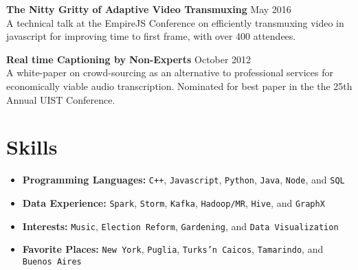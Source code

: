 \documentclass[oneside, final]{scrartcl}
\newcommand{\lang}[1]{\colorbox{light-gray}{\texttt{#1}}}
\begin{document}
\begin{center}
\begin{flushleft}
    \textbf{The Nitty Gritty of Adaptive Video Transmuxing} \hfill May  2016\\
    A technical talk at the EmpireJS Conference on efficiently transmuxing video in javascript for improving time to first frame, with over 400 attendees.
    \vspace{10pt}
    
    \textbf{Real time Captioning by Non-Experts} \hfill October  2012\\
    A white-paper on crowd-sourcing as an alternative to professional services for economically viable audio transcription. Nominated for best paper in the the 25th Annual UIST Conference.
    
\end{flushleft}


    \section{Skills}
    \begin{itemize}
        \setlength{\itemsep}{1pt}
        \setlength{\parskip}{0pt}
        \setlength{\parsep}{0pt}
        \setlength{\leftmargin}{-5mm}
       

        \item \textbf{Programming Languages:}
            \lang{C++},
            \lang{Javascript},
            \lang{Python},
            \lang{Java},
            \lang{Node}, and
            \lang{SQL} \\
            
        \item \textbf{Data Experience: }
            \lang{Spark},
            \lang{Storm},
            \lang{Kafka},
            \lang{Hadoop/MR},
            \lang{Hive}, and
            \lang{GraphX} \\

       \item \textbf{Interests:}
            \lang{Music},
            \lang{Election Reform},
            \lang{Gardening}, and
            \lang{Data Visualization} \\
            

        \item \textbf{Favorite Places:}
            \lang{New York},
            \lang{Puglia},
            \lang{Turks'n Caicos},
            \lang{Tamarindo}, and
            \lang{Buenos Aires}

    \end{itemize}

\end{center}
\end{document}
